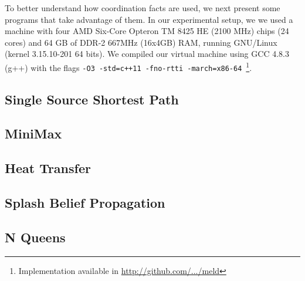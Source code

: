 
To better understand how coordination facts are used, we next present some programs that
take advantage of them. In our experimental setup, we we used a machine with
four AMD Six-Core Opteron TM 8425 HE (2100 MHz) chips (24 cores) and 64 GB of
DDR-2 667MHz (16x4GB) RAM, running GNU/Linux (kernel 3.15.10-201 64 bits).
We compiled our virtual machine using GCC 4.8.3 (g++) with the flags
\texttt{-O3 -std=c++11 -fno-rtti -march=x86-64}~\footnote{Implementation
   available in \url{http://github.com/.../meld}}.

\subsection{Single Source Shortest Path}


\subsection{MiniMax}


\subsection{Heat Transfer}


\subsection{Splash Belief Propagation}


\subsection{N Queens}

